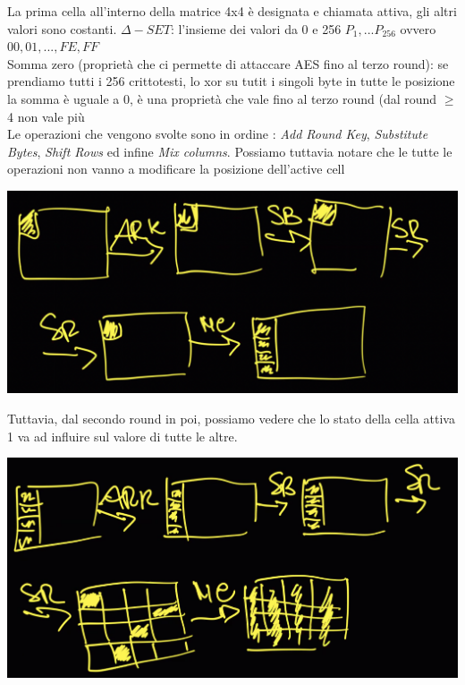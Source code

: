 \documentclass[11pt, oneside]{article}   	%
\begin{document}
\long{}	
La prima cella all'interno della matrice 4x4 è designata e chiamata attiva, gli altri valori sono costanti.
$\Delta - SET$: l'insieme dei valori da 0 e 256 $P_1, ... P_{256}$ ovvero $00, 01, ... , FE, FF$\\
Somma zero (proprietà che ci permette di attaccare AES fino al terzo round): se prendiamo tutti i 256 crittotesti, lo xor su tutit i singoli byte in tutte le posizione la somma è uguale a 0, è una proprietà che vale fino al terzo round (dal round $\geq$ 4 non vale più \\
Le operazioni che vengono svolte sono in ordine : \emph{Add Round Key}, \emph{Substitute Bytes}, \emph{Shift Rows} ed infine \emph{Mix columns}. Possiamo tuttavia notare che le tutte le operazioni non vanno a modificare la posizione dell'active cell
\begin{center}
\includegraphics[scale= 0.4]{active}
\end{center}
Tuttavia, dal secondo round in poi, possiamo vedere che lo stato della cella attiva 1 va ad influire sul valore di tutte le altre.
\begin{center}
\includegraphics[scale= 0.4]{active2}\\
\end{center}
\end{document}
